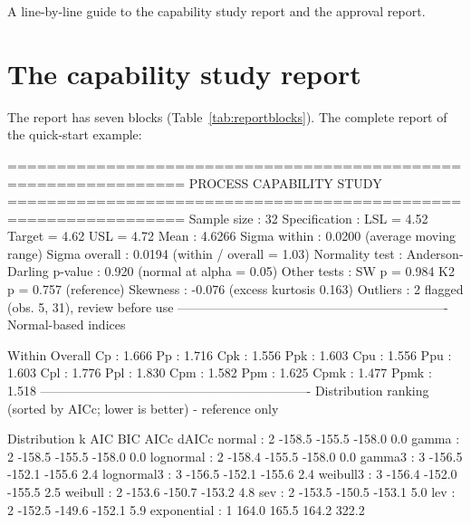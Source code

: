 \documentclass[a4paper,11pt,oneside,openany,parskip=half-,headings=standardclasses,toc=flat,numbers=noenddot]{scrbook}
\newenvironment{chapterintro}{\begingroup\sffamily\small\color{muted}\noindent\ignorespaces}{\par\endgroup\medskip}
\newcommand{\tabref}[1]{Table~\ref{#1}}
\begin{document}
\begin{chapterintro}
A line-by-line guide to the capability study report and the approval report.
\end{chapterintro}

\section{The capability study report}

The report has seven blocks (\tabref{tab:reportblocks}). The complete report of the quick-start example:

\begin{outbox}
================================================================
  PROCESS CAPABILITY STUDY
================================================================
         Sample size : 32
       Specification : LSL = 4.52   Target = 4.62   USL = 4.72
                Mean : 4.6266
        Sigma within : 0.0200   (average moving range)
       Sigma overall : 0.0194   (within / overall = 1.03)
      Normality test : Anderson-Darling
             p-value : 0.920   (normal at alpha = 0.05)
         Other tests : SW p = 0.984   K2 p = 0.757   (reference)
            Skewness : -0.076   (excess kurtosis 0.163)
            Outliers : 2 flagged (obs. 5, 31), review before use
----------------------------------------------------------------
  Normal-based indices

              Within              Overall
                  Cp :  1.666          Pp :  1.716
                 Cpk :  1.556         Ppk :  1.603
                 Cpu :  1.556         Ppu :  1.603
                 Cpl :  1.776         Ppl :  1.830
                 Cpm :  1.582         Ppm :  1.625
                Cpmk :  1.477        Ppmk :  1.518
----------------------------------------------------------------
  Distribution ranking (sorted by AICc; lower is better) - reference only

        Distribution   k   AIC        BIC        AICc       dAICc
              normal : 2   -158.5     -155.5     -158.0     0.0
               gamma : 2   -158.5     -155.5     -158.0     0.0
           lognormal : 2   -158.4     -155.5     -158.0     0.0
              gamma3 : 3   -156.5     -152.1     -155.6     2.4
          lognormal3 : 3   -156.5     -152.1     -155.6     2.4
            weibull3 : 3   -156.4     -152.0     -155.5     2.5
             weibull : 2   -153.6     -150.7     -153.2     4.8
                 sev : 2   -153.5     -150.5     -153.1     5.0
                 lev : 2   -152.5     -149.6     -152.1     5.9
         exponential : 1   164.0      165.5      164.2      322.2


\end{outbox}
\end{document}
